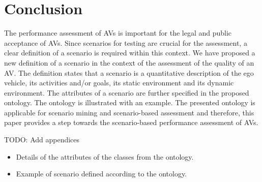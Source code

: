 \section{Conclusion}
\label{sec:conclusion}

The performance assessment of AVs is important for the legal and public acceptance of AVs. 
Since scenarios for testing are crucial for the assessment, a clear definition of a scenario is required within this context. 
We have proposed a new definition of a scenario in the context of the assessment of the quality of an AV. 
The definition states that a scenario is a quantitative description of the ego vehicle, its activities and/or goals, its static environment and its dynamic environment. 
The attributes of a scenario are further specified in the proposed ontology.
The ontology is illustrated with an example.
The presented ontology is applicable for scenario mining and scenario-based assessment and therefore, this paper provides a step towards the scenario-based performance assessment of AVs. 

\color{red}
TODO: Add appendices
\begin{itemize}
	\item Details of the attributes of the classes from the ontology.
	\item Example of scenario defined according to the ontology.
\end{itemize}
\color{black}
